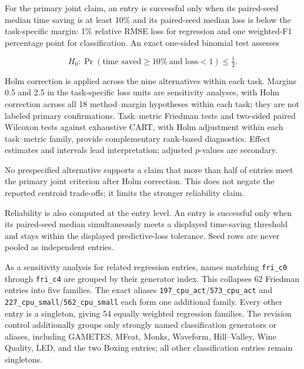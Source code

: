 \documentclass[final,5p,times,twocolumn]{elsarticle}
\begin{document}
For the primary joint claim, an entry is successful only when its paired-seed
median time saving is at least 10\% and its paired-seed median loss is below the
task-specific margin: 1\% relative RMSE loss for regression and one weighted-F1
percentage point for classification.  An exact one-sided binomial test assesses

\[
H_0:\Pr(\text{time saved}\geq10\%\ \text{and loss}<1)\leq\tfrac12.
\]

Holm correction \cite{holm1979simple} is applied across the nine alternatives within each task.
Margins 0.5 and 2.5 in the task-specific loss units are sensitivity analyses, with Holm correction across
all 18 method--margin hypotheses within each task; they are not labeled primary
confirmations.  Task--metric Friedman tests \cite{friedman1937ranks} and two-sided paired Wilcoxon tests \cite{wilcoxon1945individual}
against exhaustive CART, with Holm adjustment within each task--metric family,
provide complementary rank-based diagnostics.  Effect estimates and intervals
lead interpretation; adjusted \(p\)-values are secondary.





No prespecified alternative supports a claim that more than half of entries
meet the primary joint criterion after Holm correction.  This does not negate
the reported centroid trade-offs; it limits the stronger reliability claim.

Reliability is also computed at the entry level.  An entry is successful
only when its paired-seed median simultaneously meets a displayed time-saving
threshold and stays within the displayed predictive-loss tolerance.  Seed rows
are never pooled as independent entries.

As a sensitivity analysis for related regression entries, names matching
\texttt{fri\_c0} through \texttt{fri\_c4} are grouped by their generator index.
This collapses 62 Friedman entries into five families.  The exact aliases
\texttt{197\_cpu\_act}/\texttt{573\_cpu\_act} and
\texttt{227\_cpu\_small}/\texttt{562\_cpu\_small} each form one additional
family.  Every other entry is a singleton, giving 54 equally weighted
regression families.  The revision control additionally groups only strongly
named classification generators or aliases, including GAMETES, MFeat, Monks,
Waveform, Hill--Valley, Wine Quality, LED, and the two Boxing entries; all other
classification entries remain singletons.
\end{document}
